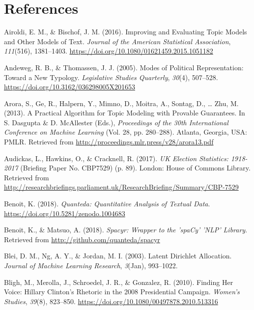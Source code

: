 \documentclass[]{article}
\theoremstyle{definition}
\theoremstyle{definition}
\theoremstyle{definition}
\theoremstyle{remark}
\begin{document}
\begin{table}[H]
\begin{table}[H]
\begin{table}[H]
\begin{table}[H]
\begin{table}[H]
\begin{table}[H]
\begin{table}[H]
\begin{table}[H]
\hypertarget{references}{%
\section*{References}\label{references}}

\hypertarget{refs}{}
\leavevmode\hypertarget{ref-airoldi2016}{}%
Airoldi, E. M., \& Bischof, J. M. (2016). Improving and Evaluating Topic
Models and Other Models of Text. \emph{Journal of the American
Statistical Association}, \emph{111}(516), 1381--1403.
\url{https://doi.org/10.1080/01621459.2015.1051182}

\leavevmode\hypertarget{ref-andeweg2005}{}%
Andeweg, R. B., \& Thomassen, J. J. (2005). Modes of Political
Representation: Toward a New Typology. \emph{Legislative Studies
Quarterly}, \emph{30}(4), 507--528.
\url{https://doi.org/10.3162/036298005X201653}

\leavevmode\hypertarget{ref-arora2013}{}%
Arora, S., Ge, R., Halpern, Y., Mimno, D., Moitra, A., Sontag, D.,
\ldots{} Zhu, M. (2013). A Practical Algorithm for Topic Modeling with
Provable Guarantees. In S. Dasgupta \& D. McAllester (Eds.),
\emph{Proceedings of the 30th International Conference on Machine
Learning} (Vol. 28, pp. 280--288). Atlanta, Georgia, USA: PMLR.
Retrieved from \url{http://proceedings.mlr.press/v28/arora13.pdf}

\leavevmode\hypertarget{ref-audickas2017}{}%
Audickas, L., Hawkins, O., \& Cracknell, R. (2017). \emph{UK Election
Statistics: 1918-2017} (Briefing Paper No. CBP7529) (p. 89). London:
House of Commons Library. Retrieved from
\url{http://researchbriefings.parliament.uk/ResearchBriefing/Summary/CBP-7529}

\leavevmode\hypertarget{ref-benoit2018}{}%
Benoit, K. (2018). \emph{Quanteda: Quantitative Analysis of Textual
Data}. \url{https://doi.org/10.5281/zenodo.1004683}

\leavevmode\hypertarget{ref-benoit2018a}{}%
Benoit, K., \& Matsuo, A. (2018). \emph{Spacyr: Wrapper to the 'spaCy'
'NLP' Library}. Retrieved from \url{http://github.com/quanteda/spacyr}

\leavevmode\hypertarget{ref-blei2003}{}%
Blei, D. M., Ng, A. Y., \& Jordan, M. I. (2003). Latent Dirichlet
Allocation. \emph{Journal of Machine Learning Research}, \emph{3}(Jan),
993--1022.

\leavevmode\hypertarget{ref-bligh2010}{}%
Bligh, M., Merolla, J., Schroedel, J. R., \& Gonzalez, R. (2010).
Finding Her Voice: Hillary Clinton's Rhetoric in the 2008 Presidential
Campaign. \emph{Women's Studies}, \emph{39}(8), 823--850.
\url{https://doi.org/10.1080/00497878.2010.513316}


\end{table}
\end{table}
\end{table}
\end{table}
\end{table}
\end{table}
\end{table}
\end{table}
\end{document}
